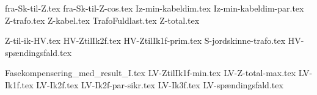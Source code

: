 \usepackage[utf8]{inputenc}%
\usepackage{amsmath}%
\usepackage{mathtools}%
\usepackage{icomma}%
\usepackage{siunitx}%
\usepackage{fp}%
\usepackage{xstring}%
\usepackage{listofitems}
\usepackage{ifthen}
\usepackage{gensymb} %

{fra-Sk-til-Z.tex}
{fra-Sk-til-Z-cos.tex}
{Iz-min-kabeldim.tex}
{Iz-min-kabeldim-par.tex}
{Z-trafo.tex}
{Z-kabel.tex}
{TrafoFuldlast.tex}
{Z-total.tex}

{Z-til-ik-HV.tex}
{HV-ZtilIk2f.tex}
{HV-ZtilIk1f-prim.tex}
{S-jordskinne-trafo.tex}
{HV-spændingsfald.tex}

{Fasekompensering_med_result_I.tex}
{LV-ZtilIk1f-min.tex}
{LV-Z-total-max.tex}
{LV-Ik1f.tex}
{LV-Ik2f.tex}
{LV-Ik2f-par-sikr.tex}
{LV-Ik3f.tex}
{LV-spændingsfald.tex}
